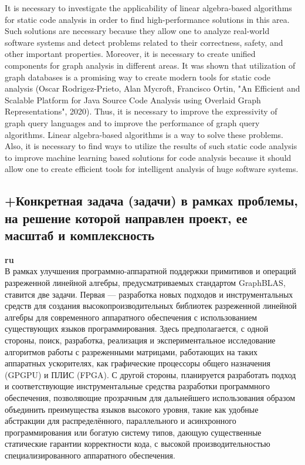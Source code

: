 \documentclass[12pt]{article}  %
\theoremstyle{remark}
\begin{document}
It is necessary to investigate the applicability of linear algebra-based algorithms for static code analysis in order to find high-performance solutions in this area. Such solutions are necessary because they allow one to analyze real-world software systems and detect problems related to their correctness, safety, and other important properties. Moreover, it is necessary to create unified components for graph analysis in different areas. It was shown that utilization of graph databases is a promising way to create modern tools for static code analysis (Oscar Rodrigez-Prieto, Alan Mycroft, Francisco Ortin, "An Efficient and Scalable Platform for Java Source Code Analysis using Overlaid Graph Representations", 2020). Thus, it is necessary to improve the expressivity of graph query languages and to improve the performance of graph query algorithms. Linear algebra-based algorithms is a way to solve these problems. Also, it is necessary to find ways to utilize the results of such static code analysis to improve machine learning based solutions for code analysis because it should allow one to create efficient tools for intelligent analysis of huge software systems.  

\subsection{+Конкретная задача (задачи) в рамках проблемы, на решение которой направлен проект, ее масштаб и комплексность}

\textbf{ru}\\
%
В рамках улучшения программно-аппаратной поддержки примитивов и операций разреженной линейной алгебры, предусматриваемых стандартом GraphBLAS, ставится две задачи. Первая --- разработка новых подходов и инструментальных средств для создания высокопроизводительных библиотек разреженной линейной алгебры для современного аппаратного обеспечения с использованием существующих языков программирования. Здесь предполагается, с одной стороны, поиск, разработка, реализация и экспериментальное исследование алгоритмов работы с разреженными матрицами, работающих на таких аппаратных ускорителях, как графические процессоры общего назначения (GPGPU) и ПЛИС (FPGA). С другой стороны, планируется разработать подход и соответствующие инструментальные средства разработки программного обеспечения, позволяющие прозрачным для дальнейшего использования образом объединить преимущества языков высокого уровня, такие как удобные абстракции для распределённого, параллельного и асинхронного программирования или богатую систему типов, дающую существенные статические гарантии корректности кода, с высокой производительностью специализированного аппаратного обеспечения.  
\end{document}
